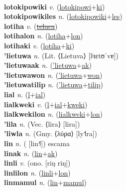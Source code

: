  \label{lotokipowinyolyan} \\
\textbf{lotokipowiki} \textit{v.} (\hyperref[lotokipowi]{lotokipowi}+\hyperref[ki]{ki})
 \label{lotokipowiki} \\
\textbf{lotokipowikiles} \textit{n.} (\hyperref[lotokipowiki]{lotokipowiki}+\hyperref[les]{les})
 \label{lotokipowikiles} \\
\textbf{lotiha} \textit{v.} (\hyperref[teluca]{\sout{teluca}})
 \label{lotiha} \\
\textbf{lotihalon} \textit{n.} (\hyperref[lotiha]{lotiha}+\hyperref[lon]{lon})
 \label{lotihalon} \\
\textbf{lotihaki} \textit{v.} (\hyperref[lotiha]{lotiha}+\hyperref[ki]{ki})
 \label{lotihaki} \\
\textbf{'lietuwa} \textit{n.} (Lit. ⟨Lietuva⟩ [lʲɪɛtʊˈvɐ])
 \label{'lietuwa} \\
\textbf{'lietuwaak} \textit{n.} (\hyperref['lietuwa]{'lietuwa}+\hyperref[ak]{ak})
 \label{'lietuwaak} \\
\textbf{'lietuwawon} \textit{n.} (\hyperref['lietuwa]{'lietuwa}+\hyperref[won]{won})
 \label{'lietuwawon} \\
\textbf{'lietuwatilip} \textit{n.} (\hyperref['lietuwa]{'lietuwa}+\hyperref[tilip]{tilip})
 \label{'lietuwatilip} \\
\textbf{lial} \textit{n.} (\hyperref[l]{l}+\hyperref[ial]{ial})
 \label{lial} \\
\textbf{lialkweki} \textit{v.} (\hyperref[l]{l}+\hyperref[ial]{ial}+\hyperref[kweki]{kweki})
 \label{lialkweki} \\
\textbf{lialkwekilon} \textit{n.} (\hyperref[lialkweki]{lialkweki}+\hyperref[lon]{lon})
 \label{lialkwekilon} \\
\textbf{'lila} \textit{n.} (Vec. ⟨lira⟩ [lira])
 \label{'lila} \\
\textbf{'liwla} \textit{n.} (Gmy. ⟨λύρα⟩ [ly˦ra])
 \label{'liwla} \\
\textbf{lin} \textit{n.} ( [lin˧˥])
escama \label{lin} \\
\textbf{linak} \textit{n.} (\hyperref[lin]{lin}+\hyperref[ak]{ak})
 \label{linak} \\
\textbf{linli} \textit{v.} (ono. [riŋ riŋ])
 \label{linli} \\
\textbf{linlilon} \textit{n.} (\hyperref[linli]{linli}+\hyperref[lon]{lon})
 \label{linlilon} \\
\textbf{linmamul} \textit{n.} (\hyperref[lin]{lin}+\hyperref[mamul]{mamul})
 \label{linmamul} \\
